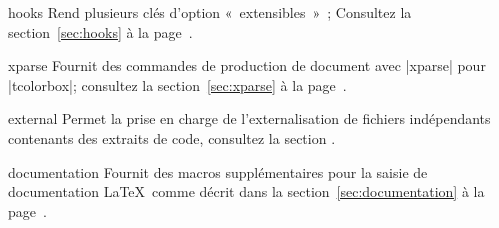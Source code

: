{\begin{docTcbKey}[library]{hooks}{}{}
  Rend plusieurs clés d'option «~extensibles~»~;
  Consultez la section~\ref{sec:hooks} à la page~\pageref{sec:hooks}.
\end{docTcbKey}

\clearpage

\begin{docTcbKey}[library]{xparse}{}{}
  Fournit des commandes de production de document avec |xparse| pour |tcolorbox|;
  consultez la section~\ref{sec:xparse} à la page~\pageref{sec:xparse}.
\end{docTcbKey}


\begin{docTcbKey}[library]{external}{}{}
  Permet la prise en charge de l'externalisation de fichiers indépendants contenants
  des extraits de code, consultez la section .
\end{docTcbKey}


\begin{docTcbKey}[library]{documentation}{}{}
  Fournit des macros supplémentaires pour la saisie de documentation \LaTeX\
  comme décrit dans la section~\ref{sec:documentation}
  à la page~\pageref{sec:documentation}.
\end{docTcbKey}


}
